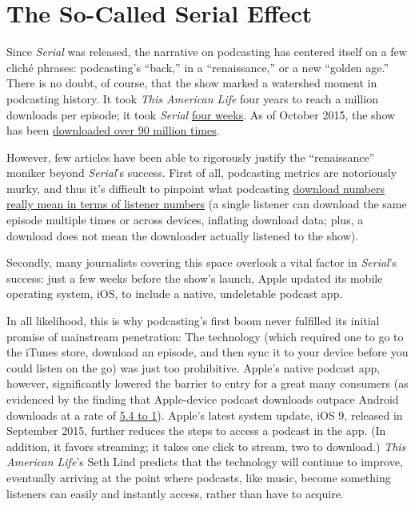 \documentclass[notoc, symmetric, nobib, nols]{towcenter-guideto-book}
\begin{document}
\section{The So-Called Serial Effect}

Since \textit{Serial} was released, the narrative on podcasting has centered itself on a few cliché phrases: podcasting's ``back,'' in a ``renaissance,'' or a new ``golden age.'' There is no doubt, of course, that the show marked a watershed moment in podcasting history. It took \textit{This American Life} four years to reach a million downloads per episode; it took \textit{Serial} \href{http://longform.org/posts/longform-podcast-159-ira-glass}{four weeks}.\autocite{IraLongform} As of October 2015, the show has been \href{http://www.nytimes.com/2015/10/01/business/media/after-serial-what-podcasts-to-listen-to.html}{downloaded over 90 million times}.\autocite{NYTAfterSerial} 

However, few articles have been able to rigorously justify the ``renaissance'' moniker beyond \textit{Serial}'s success. First of all, podcasting metrics are notoriously murky, and thus it's difficult to pinpoint what podcasting \href{https://medium.com/@pete/downloads-listens-listeners-and-about-those-podcast-numbers-73a5ee3e2fca}{download numbers really mean in terms of listener numbers} (a single listener can download the same episode multiple times or across devices, inflating download data; plus, a download does not mean the downloader actually listened to the show).\autocite{DLvsListen} 

Secondly, many journalists covering this space overlook a vital factor in \textit{Serial}'s success: just a few weeks before the show's launch, Apple updated its mobile operating system, iOS, to include a native, undeletable podcast app. 

In all likelihood, this is why podcasting's first boom never fulfilled its initial promise of mainstream penetration: The technology (which required one to go to the iTunes store, download an episode, and then sync it to your device before you could listen on the go) was just too prohibitive. Apple's native podcast app, however, significantly lowered the barrier to entry for a great many consumers (as evidenced by the finding that Apple-device podcast downloads outpace Android downloads at a rate of \href{http://www.libsyn.com/wp-content/uploads/2015/06/PRLibsynNetGrowth021915Final.pdf}{5.4 to 1}).\autocite{libsyndata} Apple's latest system update, iOS 9, released in September 2015, further reduces the steps to access a podcast in the app. (In addition, it favors streaming; it takes one click to stream, two to download.) \textit{This American Life}'s Seth Lind predicts that the technology will continue to improve, eventually arriving at the point where podcasts, like music, become something listeners can easily and instantly access, rather than have to acquire.\autocite{lind} 
\end{document}
